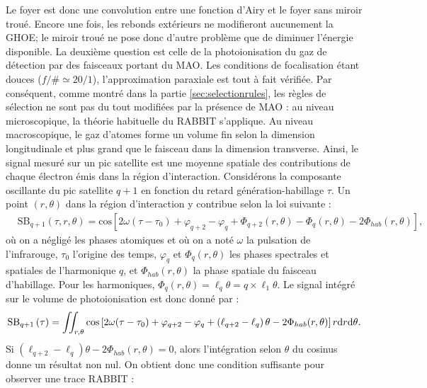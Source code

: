 Le foyer est donc une convolution entre une fonction d'Airy et le foyer sans miroir troué. Encore une fois, les rebonds extérieurs ne modifieront aucunement la GHOE; le miroir troué ne pose donc d'autre problème que de diminuer l'énergie disponible.
La deuxième question est celle de la photoionisation du gaz de détection par des faisceaux portant du MAO. Les conditions de focalisation étant douces ($f/\#\simeq 20/1$), l'approximation paraxiale est tout à fait vérifiée. Par conséquent, comme montré dans la partie \ref{sec:selectionrules}, les règles de sélection ne sont pas du tout modifiées par la présence de MAO : au niveau microscopique, la théorie habituelle du RABBIT s'applique. Au niveau macroscopique, le gaz d'atomes forme un volume fin selon la dimension longitudinale et plus grand que le faisceau dans la dimension transverse. Ainsi, le signal mesuré sur un pic satellite est une moyenne spatiale des contributions de chaque électron émis dans la région d'interaction. Considérons la composante oscillante du pic satellite $q+1$ en fonction du retard génération-habillage $\tau$. Un point $(r,\theta)$ dans la région d'interaction y contribue selon la loi suivante  : 
\begin{align*}
  & \text{S}{{\text{B}}_{q+1}}\left( \tau ,r,\theta  \right)=\text{cos}\left[ 2\omega {\left(\tau-{\tau }_{0}\right)}+{{\varphi }_{q+2}}-{{\varphi }_{q}}+{{\Phi }_{q+2}}\left( r,\theta  \right)-{{\Phi }_{q}}\left( r,\theta  \right)-2{{\Phi }_{hab}}(r,\theta ) \right],
\end{align*}
où on a négligé les phases atomiques et où on a noté $\omega$ la pulsation de l'infrarouge, $\tau_0$ l'origine des temps, $\varphi_q$ et $\Phi_q(r,\theta)$ les phases spectrales et spatiales de l'harmonique $q$, et ${\Phi }_{hab}(r,\theta)$ la phase spatiale du faisceau d'habillage. Pour les harmoniques, $\Phi_q(r,\theta)=\ell_q\theta = q\times\ell_1\theta$. Le signal intégré sur le volume de photoionisation est donc donné par :
\begin{equation*}
\text{S}{{\text{B}}_{q+1}}\left(\tau\right)=\iint_{r,\theta}{\text{cos}\left[ 2\omega {\left(\tau-{\tau }_{0}\right)}+{{\varphi }_{q+2}}-{{\varphi }_{q}}+\left(\ell_{q+2}-\ell_q\right)\theta-2{{\Phi }_{hab}}(r,\theta ) \right]r\mathrm{d} r \mathrm{d} \theta}.
\end{equation*}
Si $\left(\ell_{q+2}-\ell_q\right)\theta-2{{\Phi }_{hab}}(r,\theta ) =0 $, alors l'intégration selon $\theta$ du cosinus donne un résultat non nul. On obtient donc une condition suffisante pour observer une trace RABBIT : 
